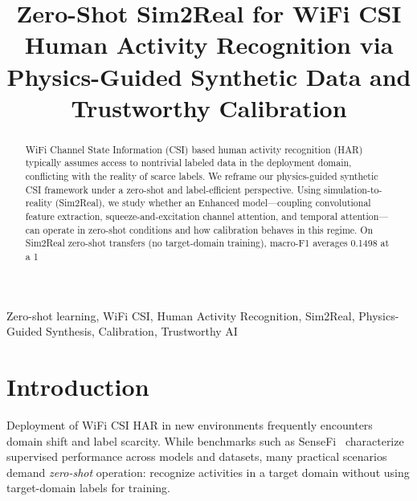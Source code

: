 \documentclass[journal]{IEEEtran}
\begin{document}
\title{Zero-Shot Sim2Real for WiFi CSI Human Activity Recognition via Physics-Guided Synthetic Data and Trustworthy Calibration}

\author{
}

\maketitle

\begin{abstract}
WiFi Channel State Information (CSI) based human activity recognition (HAR) typically assumes access to nontrivial labeled data in the deployment domain, conflicting with the reality of scarce labels. We reframe our physics-guided synthetic CSI framework under a zero-shot and label-efficient perspective. Using simulation-to-reality (Sim2Real), we study whether an Enhanced model—coupling convolutional feature extraction, squeeze-and-excitation channel attention, and temporal attention—can operate in zero-shot conditions and how calibration behaves in this regime. On Sim2Real zero-shot transfers (no target-domain training), macro-F1 averages 0.1498 at a 1%
\end{abstract}

\begin{IEEEkeywords}
Zero-shot learning, WiFi CSI, Human Activity Recognition, Sim2Real, Physics-Guided Synthesis, Calibration, Trustworthy AI
\end{IEEEkeywords}

\section{Introduction}
Deployment of WiFi CSI HAR in new environments frequently encounters domain shift and label scarcity. While benchmarks such as SenseFi~\cite{yang2023sensefi} characterize supervised performance across models and datasets, many practical scenarios demand \emph{zero-shot} operation: recognize activities in a target domain without using target-domain labels for training.
\end{document}
